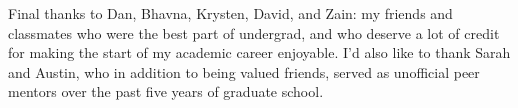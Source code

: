 \documentclass[oneside, letterpaper, 12pt, oldfontcommands]{memoir}
\begin{document}
Final thanks to Dan, Bhavna, Krysten, David, and Zain: my friends and classmates who were the best part of undergrad, and who deserve a lot of credit for making the start of my academic career enjoyable. I'd also like to thank Sarah and Austin, who in addition to being valued friends, served as unofficial peer mentors over the past five years of graduate school. 

 

 
\clearpage

\tableofcontents* %

\mainmatter










\footnotesize {}

\end{document}
